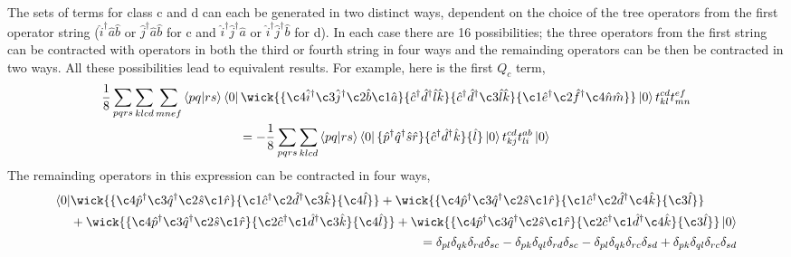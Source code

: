 The sets of terms for class c and d can each be generated in two distinct
ways, dependent on the choice of the tree operators from the first operator
string ($\hat{i}^\dagger \hat{a} \hat{b}$ or 
$\hat{j}^\dagger \hat{a} \hat{b}$ for c and 
$\hat{i}^\dagger \hat{j}^\dagger \hat{a}$ or 
$\hat{i}^\dagger \hat{j}^\dagger \hat{b}$ for d). In each case there 
are 16 possibilities; the three operators from the first string can be 
contracted with operators in both the third or fourth string in four ways and
the remainding operators can be then be contracted in two ways. All these 
possibilities lead to equivalent results. For example, here is the first 
$Q_c$ term,
\begin{equation}
    \begin{gathered}
    \frac{1}{8} \sum_{pqrs} \sum_{klcd} \sum_{mnef}
    \bra{pq} \ket{rs} \bra{0}
        \wick{
        \{\c4{\hat{i}}^\dagger \c3{\hat{j}}^\dagger \c2{\hat{b}} \c1{\hat{a}} \}
        \{\hat{c}^\dagger \hat{d}^\dagger \hat{l} \hat{k} \} 
        \{\hat{c}^\dagger \hat{d}^\dagger \c3{\hat{l}} \hat{k} \}
        \{\c1{\hat{e}}^\dagger \c2{\hat{f}}^\dagger \c4{\hat{n}} \hat{m} \}
        }
    \ket{0} t^{cd}_{kl} t^{ef}_{mn} \\
    = - \frac{1}{8} \sum_{pqrs} \sum_{klcd}
    \bra{pq} \ket{rs} \bra{0} 
        \{\hat{p}^\dagger \hat{q}^\dagger \hat{s} \hat{r} \}
        \{\hat{c}^\dagger \hat{d}^\dagger \hat{k} \}
        \{\hat{l} \}
    \ket{0} t^{cd}_{kj} t^{ab}_{li}
    \ket{0}
    \end{gathered}
\end{equation}
The remainding operators in this expression can be contracted in four ways,
\begin{align}
    \begin{aligned}
        \bra{0}&
        \wick{
        \{\c4{\hat{p}}^\dagger \c3{\hat{q}}^\dagger \c2{\hat{s}} \c1{\hat{r}}\}
        \{\c1{\hat{c}}^\dagger \c2{\hat{d}}^\dagger \c3{\hat{k}} \}
        \{\c4{\hat{l}} \}
        }
        +
        \wick{
        \{\c4{\hat{p}}^\dagger \c3{\hat{q}}^\dagger \c2{\hat{s}} \c1{\hat{r}}\}
        \{\c1{\hat{c}}^\dagger \c2{\hat{d}}^\dagger \c4{\hat{k}} \}
        \{\c3{\hat{l}} \}
        } \\
        &+
        \wick{
        \{\c4{\hat{p}}^\dagger \c3{\hat{q}}^\dagger \c2{\hat{s}} \c1{\hat{r}}\}
        \{\c2{\hat{c}}^\dagger \c1{\hat{d}}^\dagger \c3{\hat{k}} \}
        \{\c4{\hat{l}} \}
        }
        +
        \wick{
        \{\c4{\hat{p}}^\dagger \c3{\hat{q}}^\dagger \c2{\hat{s}} \c1{\hat{r}}\}
        \{\c2{\hat{c}}^\dagger \c1{\hat{d}}^\dagger \c4{\hat{k}} \}
        \{\c3{\hat{l}} \}
        } \ket{0}
    \end{aligned} \\
    = \delta_{pl} \delta_{qk} \delta_{rd} \delta_{sc}
    - \delta_{pk} \delta_{ql} \delta_{rd} \delta_{sc}
    - \delta_{pl} \delta_{qk} \delta_{rc} \delta_{sd}
    + \delta_{pk} \delta_{ql} \delta_{rc} \delta_{sd}
\end{align}
